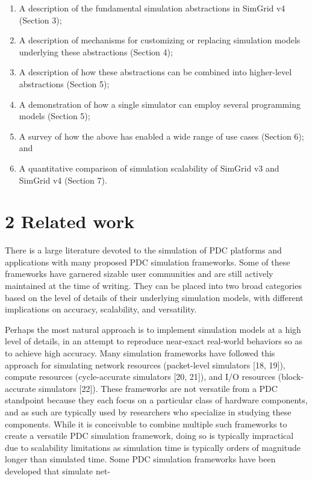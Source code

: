 \documentclass[
]{article}
\providecommand{\tightlist}{%
  \setlength{\itemsep}{0pt}\setlength{\parskip}{0pt}}
\begin{document}
\begin{enumerate}
\def\labelenumi{\arabic{enumi}.}
\tightlist
\item
  A description of the fundamental simulation abstractions in SimGrid v4
  (Section 3);\\
\item
  A description of mechanisms for customizing or replacing simulation
  models underlying these abstractions (Section 4);\\
\item
  A description of how these abstractions can be combined into
  higher-level abstractions (Section 5);\\
\item
  A demonstration of how a single simulator can employ several
  programming models (Section 5);\\
\item
  A survey of how the above has enabled a wide range of use cases
  (Section 6); and\\
\item
  A quantitative comparison of simulation scalability of SimGrid v3 and
  SimGrid v4 (Section 7).
\end{enumerate}

\section{2 Related work}\label{related-work}

There is a large literature devoted to the simulation of PDC platforms
and applications with many proposed PDC simulation frameworks. Some of
these frameworks have garnered sizable user communities and are still
actively maintained at the time of writing. They can be placed into two
broad categories based on the level of details of their underlying
simulation models, with different implications on accuracy, scalability,
and versatility.

Perhaps the most natural approach is to implement simulation models at a
high level of details, in an attempt to reproduce near-exact real-world
behaviors so as to achieve high accuracy. Many simulation frameworks
have followed this approach for simulating network resources
(packet-level simulators {[}18, 19{]}), compute resources
(cycle-accurate simulators {[}20, 21{]}), and I/O resources
(block-accurate simulators {[}22{]}). These frameworks are not versatile
from a PDC standpoint because they each focus on a particular class of
hardware components, and as such are typically used by researchers who
specialize in studying these components. While it is conceivable to
combine multiple such frameworks to create a versatile PDC simulation
framework, doing so is typically impractical due to scalability
limitations as simulation time is typically orders of magnitude longer
than simulated time. Some PDC simulation frameworks have been developed
that simulate net-
\end{document}
